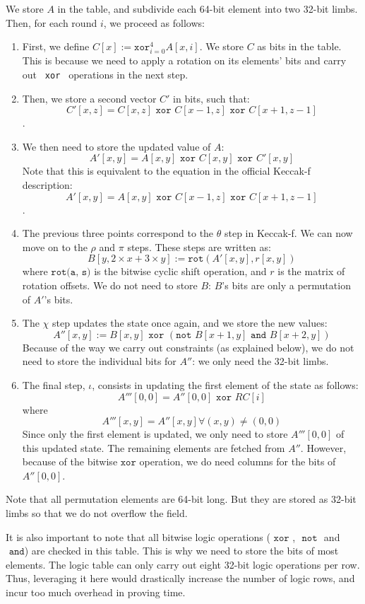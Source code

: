 We store $A$ in the table, and subdivide each 64-bit element into two 32-bit limbs.
Then, for each round $i$, we proceed as follows:
\begin{enumerate}
    \item First, we define $C[x] := \texttt{xor}_{i=0}^4 A[x, i]$. We store $C$ as bits in the table. This is because we need to apply a rotation on its elements' bits and carry out \texttt{ xor } operations in the next step.
    \item Then, we store a second vector $C'$ in bits, such that: $$C'[x, z] = C[x, z] \texttt{ xor } C[x-1, z] \texttt{ xor } C[x+1, z-1]$$. 
    \item We then need to store the updated value of $A$: $$A'[x, y] = A[x, y] \texttt{ xor } C[x, y] \texttt{ xor } C'[x, y]$$ Note that this is equivalent to the equation in the official Keccak-f description: $$A'[x, y] = A[x, y] \texttt{ xor } C[x-1, z] \texttt{ xor } C[x+1, z-1]$$.
    \item The previous three points correspond to the $\theta$ step in Keccak-f. We can now move on to the $\rho$ and $\pi$ steps. These steps are written as: $$B[y, 2\times x + 3 \times y] := \texttt{rot}(A'[x, y], r[x, y])$$ where $\texttt{rot(a, s)}$ is the bitwise cyclic shift operation, and $r$ is the matrix of rotation offsets. We do not need to store $B$: $B$'s bits are only a permutation of $A'$'s bits. 
    \item The $\chi$ step updates the state once again, and we store the new values: $$A''[x, y] := B[x, y] \texttt{ xor } (\texttt{not }B[x+1, y] \texttt{ and } B[x+2, y])$$ Because of the way we carry out constraints (as explained below), we do not need to store the individual bits for $A''$: we only need the 32-bit limbs.
    \item The final step, $\iota$, consists in updating the first element of the state as follows: $$A'''[0, 0] = A''[0, 0] \texttt{ xor } RC[i]$$ where $$A'''[x, y] = A''[x, y] \forall (x, y) \neq (0, 0)$$ Since only the first element is updated, we only need to store $A'''[0, 0]$ of this updated state. The remaining elements are fetched from $A''$. However, because of the bitwise $\texttt{xor}$ operation, we do need columns for the bits of $A''[0, 0]$.  
\end{enumerate}

Note that all permutation elements are 64-bit long. But they are stored as 32-bit limbs so that we do not overflow the field. 

It is also important to note that all bitwise logic operations ($\texttt{ xor }$, $\texttt{ not }$ and $\texttt{ and}$) are checked in this table. This is why we need to store the bits of most elements. The logic table can only carry out eight 32-bit logic operations per row. Thus, leveraging it here would drastically increase the number of logic rows, and incur too much overhead in proving time.



